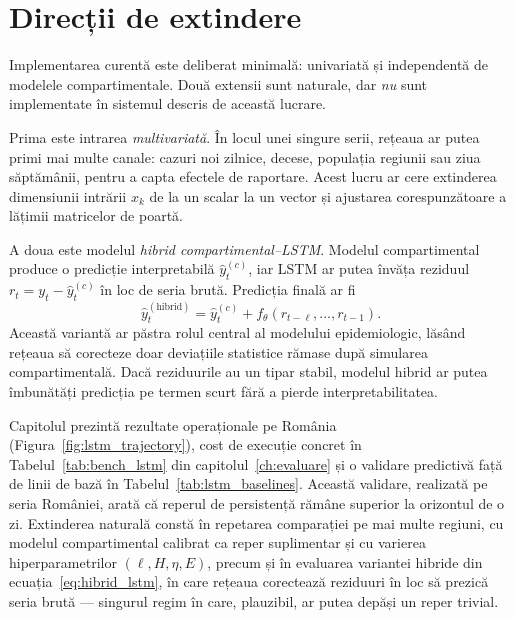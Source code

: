 \section{Direcții de extindere}
\label{sec:extindere_lstm}

Implementarea curentă este deliberat minimală: univariată și independentă de
modelele compartimentale. Două extensii sunt naturale, dar \emph{nu} sunt
implementate în sistemul descris de această lucrare.

Prima este intrarea \emph{multivariată}. În locul unei singure serii, rețeaua ar
putea primi mai multe canale: cazuri noi zilnice, decese, populația regiunii sau
ziua săptămânii, pentru a capta efectele de raportare. Acest lucru ar cere
extinderea dimensiunii intrării $x_k$ de la un scalar la un vector și ajustarea
corespunzătoare a lățimii matricelor de poartă.

A doua este modelul \emph{hibrid compartimental--LSTM}. Modelul compartimental
produce o predicție interpretabilă $\hat{y}^{(c)}_t$, iar LSTM ar putea învăța
reziduul $r_t = y_t - \hat{y}^{(c)}_t$ în loc de seria brută. Predicția finală ar
fi
\begin{equation}
\label{eq:hibrid_lstm}
\hat{y}^{(\mathrm{hibrid})}_{t} =
\hat{y}^{(c)}_{t} + f_{\theta}\!\left(r_{t-\ell}, \ldots, r_{t-1}\right).
\end{equation}
Această variantă ar păstra rolul central al modelului epidemiologic, lăsând
rețeaua să corecteze doar deviațiile statistice rămase după simularea
compartimentală. Dacă reziduurile au un tipar stabil, modelul hibrid ar putea
îmbunătăți predicția pe termen scurt fără a pierde interpretabilitatea.

Capitolul prezintă rezultate operaționale pe România (Figura~\ref{fig:lstm_trajectory}),
cost de execuție concret în Tabelul~\ref{tab:bench_lstm} din
capitolul~\ref{ch:evaluare} și o validare predictivă față de linii de bază în
Tabelul~\ref{tab:lstm_baselines}. Această validare, realizată pe seria României,
arată că reperul de persistență rămâne superior la orizontul de o zi. Extinderea
naturală constă în repetarea comparației pe mai multe regiuni, cu modelul
compartimental calibrat ca reper suplimentar și cu varierea hiperparametrilor
$(\ell, H, \eta, E)$, precum și în evaluarea variantei hibride din
ecuația~\eqref{eq:hibrid_lstm}, în care rețeaua corectează reziduuri în loc să
prezică seria brută --- singurul regim în care, plauzibil, ar putea depăși un
reper trivial.
